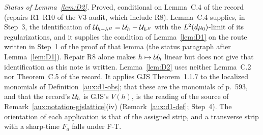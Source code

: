 \emph{Status of Lemma~\ref{lem:D2}.}  Proved, conditional on Lemma~C.4 of the record (repairs
R1--R10 of the V3 audit, which include R8).  Lemma~C.4 supplies, in Step~3, the identification of
$\mathcal U_{h-h^B}=\mathcal U_h-\mathcal U_{h^B}$ with the $L^2(d\mu_0)$-limit of its regularizations, and it supplies
the condition of Lemma~\ref{lem:D1} on the route written in Step~1 of the proof of that lemma (the
status paragraph after Lemma~\ref{lem:D1}).  Repair R8 alone makes $h\mapsto\mathcal U_h$ linear but
does not give that identification as this note is written.  Lemma~\ref{lem:D2} uses neither
Lemma~C.2 nor Theorem~C.5 of the record.  It applies GJS Theorem~1.1.7 to the localized monomials
of Definition~\ref{aux:d1-obs}; that these are the monomials of p.~593, and that the record's
$\mathcal U_h$ is GJS's $V(h)$, is the reading of the source of Remark~\ref{aux:notation-gjslattice}(iv)
(Remark~\ref{aux:d1-def}; Step~4).  The orientation of each application is that of the assigned
strip, and a transverse strip with a sharp-time $F_a$ falls under F-T.

